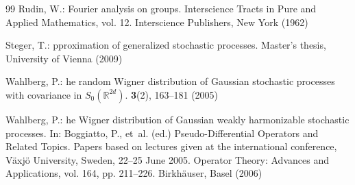 \documentclass[graybox]{svmult}
\begin{document}
\begin{thebibliography}{99}
 Rudin, W.: Fourier analysis on groups.
   Interscience Tracts in Pure and Applied Mathematics, vol. 12.
   Interscience Publishers, New York (1962)

{S}teger, T.:
pproximation of generalized stochastic processes.
\newblock Master's thesis, {U}niversity of {V}ienna (2009)

{W}ahlberg, P.:
he random {W}igner distribution of {G}aussian stochastic processes
with covariance in ${S}_0 ({\mathbb{R}}^{2d})$.
 {\bf 3}(2), 163--181 (2005)

{W}ahlberg, P.:
he {W}igner distribution of {G}aussian weakly
harmonizable stochastic processes.
\newblock In: {B}oggiatto, P., et~al. (ed.) {{P}seudo-Differential
Operators and Related Topics. {P}apers based on lectures given at the
international conference, {V}{\"a}xj{\"o} {U}niversity, {S}weden, 22--25 {J}une  2005.}  {{O}perator {T}heory: {A}dvances and
{A}pplications},  vol. 164, pp. 211--226.   {B}irkh{\"a}user, Basel (2006)
\end{thebibliography}
\end{document}
